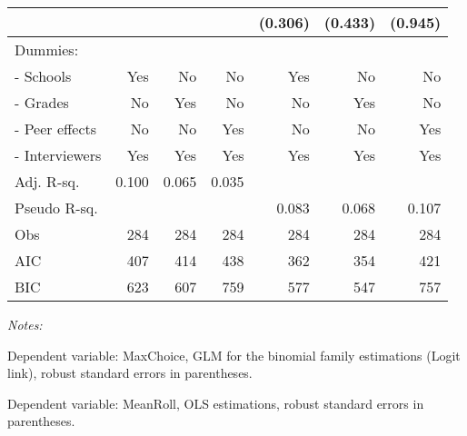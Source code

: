 \begin{table}[htbp]
\begin{adjustbox}{width=1\textwidth}
\begin{threeparttable}
\begin{tabular}{l*{6}{D{.}{.}{-1}}}
                    &                       &                       &                       &             (0.306)   &             (0.433)   &             (0.945)   \\ \midrule
Dummies: &&&&& \\                    
- Schools             &                 Yes   &                  No   &                  No   &                 Yes   &                  No   &                  No   \\
- Grades              &                  No   &                 Yes   &                  No   &                  No   &                 Yes   &                  No   \\
- Peer effects        &                  No   &                  No   &                 Yes   &                  No   &                  No   &                 Yes   \\
- Interviewers        &                 Yes   &                 Yes   &                 Yes   &                 Yes   &                 Yes   &                 Yes   \\
\midrule
Adj. R-sq.          &               0.100   &               0.065   &               0.035   &     	          &   	                &                 \\
Pseudo R-sq.        &                       &                       &       &     0.083	          &   0.068	                &           0.107 \\
Obs                 &                 284   &                 284   &                 284   &                 284   &                 284   &                 284   \\
AIC                 &                 407   &                 414   &                 438   &                 362   &                 354   &                 421   \\
BIC                 &                 623   &                 607   &                 759   &                 577   &                 547   &                 757   \\
\bottomrule
\end{tabular}
\begin{tablenotes}
\footnotesize
\item \textit{Notes:} \\
\item[1] Dependent variable: MaxChoice, GLM for the binomial family estimations (Logit link), robust standard errors in parentheses. \\
\item[2] Dependent variable: MeanRoll, OLS estimations, robust standard errors in parentheses. \\ 

\end{tablenotes}
\end{threeparttable}
\end{adjustbox}
\end{table}
